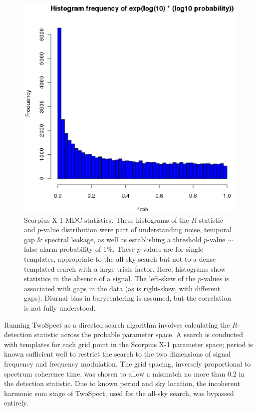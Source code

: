 \begin{figure}
\begin{center}
\includegraphics[width=0.6\paperwidth,height=0.35\paperheight]{StatHistProbH1.eps}
\caption{Scorpius X-1 MDC statistics. These histograms of the $R$ statistic and $p$-value distribution were part of understanding noise, temporal gap \& spectral leakage, as well as establishing a threshold $p$-value $\sim$ false alarm probability of 1\%.
These $p$-values are for single templates, appropriate to the all-sky search but not to a dense templated search with a large trials factor.
Here, histograms show statistics in the absence of a signal. 
The left-skew of the $p$-values is associated with gaps in the data (as is right-skew, with different gaps).
Diurnal bias in barycentering is assumed, but the correlation is not fully understood.
}
\end{center}
\end{figure}



Running TwoSpect as a directed search algorithm involves calculating
the $R$-detection statistic across the probable parameter space. 
A search is conducted with templates for each grid point in the Scorpius 
X-1 parameter space; period is known sufficient well to restrict the search
to the two dimensions of signal frequency and frequency modulation. The
grid spacing, inversely proportional to spectrum coherence time, was
chosen to allow a mismatch no more than $0.2$ in the detection statistic.
Due to known period and sky location, the incoherent harmonic sum stage
of TwoSpect, used for the all-sky search, was bypassed entirely. 

